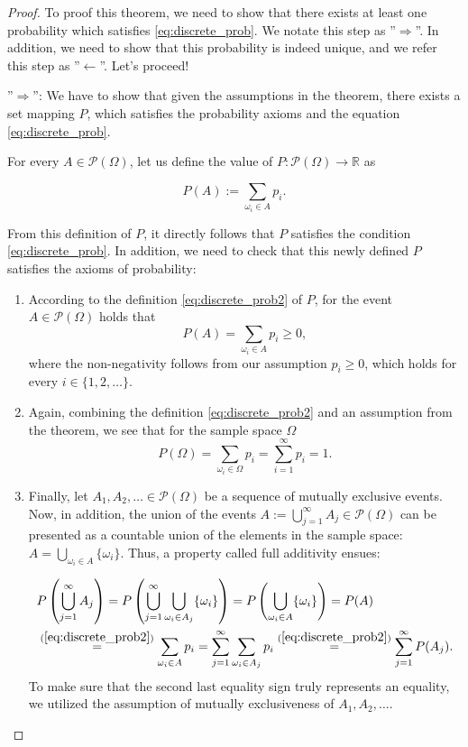 \documentclass[12pt,a4paper,leqno]{report}
\newcommand{\R}{\mathbb{R}}
\theoremstyle{plain}
\theoremstyle{definition}
\begin{document}
\begin{proof}
To proof this theorem, we need to show that there exists at least one probability which satisfies \ref{eq:discrete_prob}. We notate this step as ''$\Rightarrow$''. In addition, we need to show that this probability is indeed unique, and we refer this step as ''$\leftarrow$''. Let's proceed!

''$\Rightarrow$'': We have to show that given the assumptions in the theorem, there exists a set mapping $P$, which satisfies the probability axioms and the equation \ref{eq:discrete_prob}. 

For every $A \in \mathcal{P}(\Omega)$, let us define the value of $P:\mathcal{P}(\Omega) \rightarrow \R$ as

\begin{equation}
\label{eq:discrete_prob2}
P(A)  := \sum_{\omega_i \in A} p_i.
\end{equation}

\bigskip

From this definition of $P$, it directly follows that $P$ satisfies the condition \ref{eq:discrete_prob}. In addition, we need to check that this newly defined $P$ satisfies the axioms of probability:

\begin{enumerate}[(PROB1)]
\item According to the definition \ref{eq:discrete_prob2} of $P$, for the event $A \in \mathcal{P}(\Omega)$ holds that 
\[
P(A) = \sum_{\omega_i \in A} p_i \geq 0,
\]
where the non-negativity follows from our assumption $p_i \geq 0$, which holds for every $i \in \{1,2, \dots\}$.

\item Again, combining the definition \ref{eq:discrete_prob2} and an assumption from the theorem, we see that for the sample space $\Omega$
\[
P(\Omega) = \sum_{\omega_i \in \Omega} p_i = \sum_{i=1}^\infty p_i = 1.
\]

\item Finally, let $A_1, A_2, \dots \in \mathcal{P}(\Omega)$ be a sequence of mutually exclusive events. Now, in addition, the union of the events $A := \bigcup_{j=1}^\infty A_j \in \mathcal{P}(\Omega)$ can be presented as a countable union of the elements in the sample space: $A = \bigcup_{\omega_i \in A} \{\omega_i\}$. Thus, a property called full additivity ensues:

\[
\begin{split}
&P\left(\bigcup_{j=1}^\infty A_j \right) 
= P\left(\bigcup_{j=1}^\infty \bigcup_{\omega_i \in A_j} \{\omega_i\} \right) 
= P\left(\bigcup_{\omega_i \in A} \{\omega_i\} \right) = P(A) \\
&\overset{(\ref{eq:discrete_prob2})}{=} \sum_{\omega_i \in A} p_i
= \sum_{j=1}^\infty \sum_{\omega_i \in A_j} p_i
\overset{(\ref{eq:discrete_prob2})}{=} \sum_{j=1}^\infty P(A_j).
\end{split}
\]
To make sure that the second last equality sign truly represents an equality, we utilized the assumption of mutually exclusiveness of $A_1, A_2, \dots$.
\end{enumerate}


\end{proof}
\end{document}
